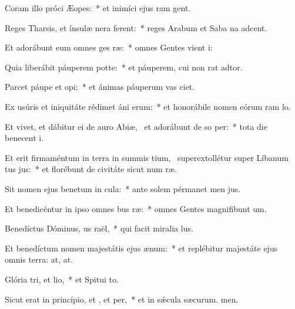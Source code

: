\item Coram illo próci Æopes:~* et inimíci ejus ram gent.
\item Reges Tharsis, et ínsulæ nera ferent:~* reges Arabum et Saba na adcent.
\item Et adorábunt eum omnes ges ræ:~* omnes Gentes vient i:
\item Quia liberábit páuperem  potte:~* et páuperem, cui non rat adtor.
\item Parcet páupe et opi:~* et ánimas páuperum vas ciet.
\item Ex usúris et iniquitáte rédimet áni erum:~* et honorábile nomen eórum ram lo.
\item Et vivet, et dábitur ei de auro Abiæ,~\pscross{} et adorábunt de so per:~* tota die benecent i.
\item Et erit firmaméntum in terra in summis tium,~\pscross{} superextollétur super Líbanum tus jus:~* et florébunt de civitáte sicut num ræ.
\item Sit nomen ejus benetum in cula:~* ante solem pérmanet men jus.
\item Et benedicéntur in ipso omnes bus ræ:~* omnes Gentes magnifibunt um.
\item Benedíctus Dóminus, us raël,~* qui facit miralia lus.
\item Et benedíctum nomen majestátis ejus  ænum:~* et replébitur majestáte ejus omnis terra: at, at.
\item Glória tri, et lio,~* et Spitui to.
\item Sicut erat in princípio, et , et per,~* et in sǽcula sæcurum. men.
